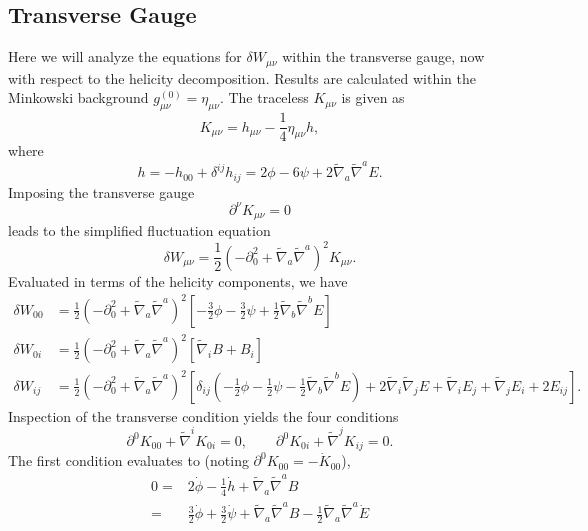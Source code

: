 \documentclass[10pt,letterpaper]{article}
\numberwithin{equation}{subsection}
\begin{document}
\subsection{Transverse Gauge}
Here we will analyze the equations for $\delta W_{\mu\nu}$ within the transverse gauge, now with respect to the helicity decomposition. Results are calculated within the Minkowski background $g_{\mu\nu}^{(0)} = \eta_{\mu\nu}$. The traceless $K_{\mu\nu}$ is given as
\begin{equation}
K_{\mu\nu} = h_{\mu\nu} - \frac14 \eta_{\mu\nu} h,
\end{equation}
where 
\begin{equation}
h = -h_{00}+ \delta^{ij}h_{ij} = 2\phi - 6\psi + 2\tilde\nabla_a \tilde\nabla^a E.
\end{equation}
Imposing the transverse gauge 
\begin{equation}
\partial^\nu K_{\mu\nu} = 0
\end{equation}
leads to the simplified fluctuation equation
\begin{equation}
\delta W_{\mu\nu} = \frac12 \left( - \partial_0^2 +  \tilde\nabla_a\tilde\nabla^a\right)^2 K_{\mu\nu} .
\end{equation}
Evaluated in terms of the helicity components, we have
\begin{align}
\delta W_{00}&{}=\frac12\left( - \partial_0^2 +  \tilde\nabla_a\tilde\nabla^a\right)^2 \left[ -\frac32 \phi - \frac32 \psi + \frac12  \tilde\nabla_b\tilde\nabla^b  E\right]
\nonumber\\
\delta W_{0i}&{} = \frac12\left( - \partial_0^2 +  \tilde\nabla_a\tilde\nabla^a\right)^2 \left[ \tilde\nabla_i B + B_i\right]
\nonumber\\
\delta W_{ij}&{} = \frac12 \left( - \partial_0^2 +  \tilde\nabla_a\tilde\nabla^a\right)^2 \left[ \delta_{ij}\left( - \frac12 \phi - \frac12 \psi -\frac12  \tilde\nabla_b\tilde\nabla^b E \right)
+ 2 \tilde\nabla_i \tilde\nabla_j E + \tilde\nabla_i E_j + \tilde\nabla_j E_i + 2E_{ij}\right].
\end{align}
Inspection of the transverse condition yields the four conditions
\begin{equation}
\partial^0K_{00} + \tilde\nabla^i K_{0i}=0,\qquad \partial^0K_{0i} + \tilde\nabla^j K_{ij} = 0.
\end{equation}
The first condition evaluates to (noting $\partial^0 K_{00} = -\dot K_{00}$),
\begin{align}
0=&{} 2\dot\phi - \frac14 \dot h +  \tilde\nabla_a\tilde\nabla^a B
\nonumber\\
=&\frac32 \dot\phi + \frac32 \dot \psi +  \tilde\nabla_a\tilde\nabla^a B - \frac12  \tilde\nabla_a\tilde\nabla^a \dot E
\end{align}
\end{document}
